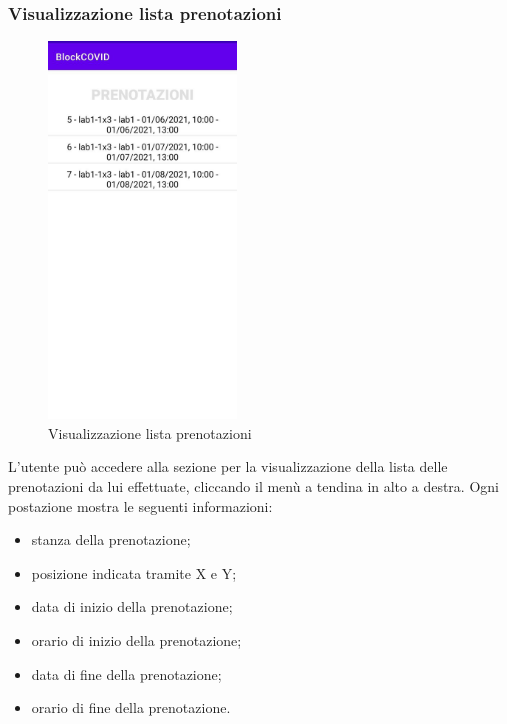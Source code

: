 \subsubsection{Visualizzazione lista prenotazioni}
\begin{figure}[H]
	\centering
	\includegraphics[width=5cm]{res/images/VisualizzaPrenotazioni.png}
	\caption{Visualizzazione lista prenotazioni}
\end{figure}
L’utente può accedere alla sezione per la visualizzazione della lista delle prenotazioni da lui effettuate, cliccando il menù a tendina in alto a destra.
Ogni postazione mostra le seguenti informazioni:
\begin{itemize}
	\item stanza della prenotazione;
	\item posizione indicata tramite X e Y;
	\item data di inizio della prenotazione;
	\item orario di inizio della prenotazione;
	\item data di fine della prenotazione;
	\item orario di fine della prenotazione.
\end{itemize}

